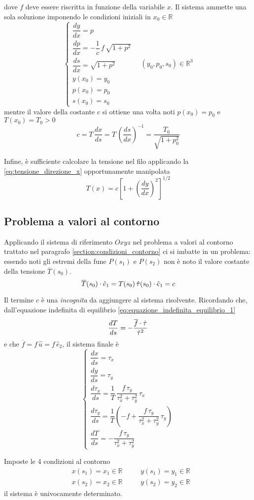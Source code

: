 dove $f$ deve essere riscritta in funzione della variabile $x$. Il sistema ammette una sola soluzione imponendo le condizioni iniziali in $x_0\in\mathbb{R}$
\[
\begin{cases}
	\dfrac{dy}{dx} = p\\[1.5ex]	
	\dfrac{dp}{dx} = -\dfrac{1}{c}\,f\,\sqrt{1+p^2}\\[1.5ex]
	\dfrac{ds}{dx} = \sqrt{1+p^2}\\[1.5ex]
	y(x_0) = y_0\\
	p(x_0) = p_0\\
	s(x_0) = s_0
\end{cases}\quad (y_0,p_0,s_0)\in\mathbb{R}^3
\]
mentre il valore della costante $c$ si ottiene una volta noti $p(x_0) = p_0$ e $T(x_0) = T_0>0$
\[
c = T\,\dfrac{dx}{ds} = T\,\left(\dfrac{ds}{dx}\right)^{-1} = \dfrac{T_0}{\sqrt{1+p_0^2}}
\]

Infine, è sufficiente calcolare la tensione nel filo applicando la \eqref{eq:tensione_direzione_x} opportunamente manipolata
\begin{equation}
	\label{eq:calcolo_tensione}
	T(x) = c\left[1+ \left(\dfrac{dy}{dx}\right)^2\right]^{1/2}
\end{equation}

\subsection{Problema a valori al contorno}
Applicando il sistema di riferimento $Oxyz$ nel problema a valori al contorno trattato nel paragrafo \ref{section:condizioni_contorno} ci si imbatte in un problema: essendo noti gli estremi della fune $P(s_1)$ e $P(s_2)$ non è noto il valore costante della tensione $\overline{T}(s_0)$. 
\[
\overline{T}(s_0)\cdot \hat{e}_1	= T(s_0)\,\hat{\tau} (s_0)\cdot\hat{e}_1 = c 
\]

Il termine $c$ è una \emph{incognita} da aggiungere al sistema risolvente. Ricordando che, dall'equazione indefinita di equilibrio \eqref{eq:equazione_indefinita_equilibrio_1}
\[
	\dfrac{dT}{ds} = -\dfrac{\overline{f}\cdot\hat{\tau}}{\hat{\tau}^2}
\]
e che $\overline{f} = f\,\hat{u} = f\,\hat{e}_2$, il sistema finale è
\[
	\begin{cases}
\dfrac{dx}{ds} = \tau_x\\[1.5ex]
\dfrac{dy}{ds} = \tau_y\\[1.5ex]
\dfrac{d\tau_x}{ds} = \dfrac{1}{T}\,\dfrac{f\,\tau_y}{\tau_x^2 + \tau_y^2}\,\tau_x\\[1.5ex]
\dfrac{d\tau_y}{ds} = \dfrac{1}{T}\left(-f+\dfrac{f\,\tau_y}{\tau_x^2 + \tau_y^2}\,\tau_y\right)\\[1.5ex]
\dfrac{dT}{ds} = -\dfrac{f\,\tau_y}{\tau_x^2 + \tau_y^2}
	\end{cases}
\]

Imposte le 4 condizioni al contorno
\begin{align*}
	&x(s_1) = x_1\in\mathbb{R} \quad &&y(s_1) = y_1\in\mathbb{R}\\
	&x(s_2) = x_2\in\mathbb{R} \quad &&y(s_2) = y_2\in\mathbb{R}
\end{align*}
il sistema è univocamente determinato.
